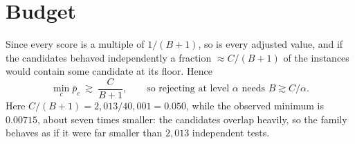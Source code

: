 \documentclass[11pt,a4paper]{article}
\theoremstyle{remark}
\newcommand{\adj}{\bar p}
\begin{document}
\section{Budget}

Since every score is a multiple of $1/(B+1)$, so is every adjusted value, and
if the candidates behaved independently a fraction $\approx C/(B+1)$ of the
instances would contain some candidate at its floor. Hence
\[
  \min_c\adj_c\ \gtrsim\ \frac{C}{B+1},
  \qquad\text{so rejecting at level }\alpha\text{ needs } B\gtrsim C/\alpha .
\]
Here $C/(B+1)=2{,}013/40{,}001=0.050$, while the observed minimum is
$0.00715$, about seven times smaller: the candidates overlap heavily, so the
family behaves as if it were far smaller than $2{,}013$ independent tests.
\end{document}
